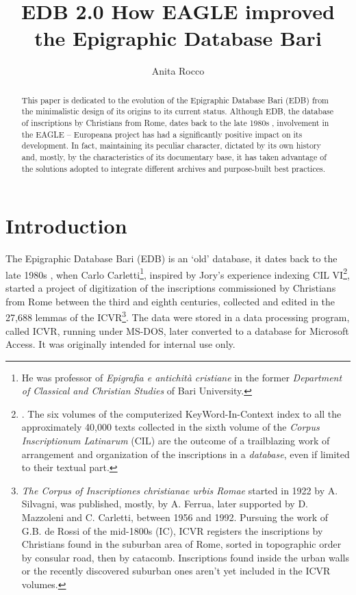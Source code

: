 \documentclass[amsthm,ebook]{saparticle}
\title{EDB 2.0 
How EAGLE improved the Epigraphic Database Bari}
\author[uniba]{Anita Rocco \corref{first}}
\begin{document}
\maketitle
\begin{abstract}
This paper is dedicated to the evolution of the Epigraphic Database Bari (EDB) from the minimalistic design of its
origins to its current status. Although EDB, the database of inscriptions by Christians from Rome, dates back to the
late 1980s , involvement in the EAGLE – Europeana project has had a significantly positive impact on its development.
In fact, maintaining its peculiar character, dictated by its own history and, mostly, by the characteristics of its
documentary base, it has taken advantage of the solutions adopted to integrate different archives and purpose-built
best practices. 
\end{abstract}










\section{Introduction}


\noindent The Epigraphic Database Bari (EDB) is an `old' database, it dates back to the late 1980s , when Carlo Carletti\footnote{
He was professor of \emph{Epigrafia e antichità cristiane} in the former \emph{Department of Classical and Christian Studies} of Bari
University.}, inspired by Jory's experience indexing CIL VI\footnote{\citet{_corpus_1974}. The six volumes of the
computerized KeyWord-In-Context index to all the approximately 40,000 texts collected in the sixth volume of the \emph{Corpus
Inscriptionum Latinarum} (CIL) are the outcome of a trailblazing work of arrangement and organization of the
inscriptions in a \emph{database}, even if limited to their textual part.}, started a project of digitization of the
inscriptions commissioned by Christians from Rome between the third and eighth centuries, collected and edited in the
27,688 lemmas of the ICVR\footnote{\emph{The Corpus of Inscriptiones christianae urbis Romae} started in 1922 by A. Silvagni,
was published, mostly, by A. Ferrua, later supported by D. Mazzoleni and C. Carletti, between 1956 and 1992. Pursuing
the work of G.B. de Rossi of the mid-1800s (IC), ICVR registers the inscriptions by Christians found in the suburban
area of Rome, sorted in topographic order by consular road, then by catacomb. Inscriptions found inside the urban walls
or the recently discovered suburban ones aren’t yet included in the ICVR volumes.}. The data were stored in a data
processing program, called ICVR, running under MS-DOS, later converted to a database for Microsoft Access. It was
originally intended for internal use only.
\end{document}
